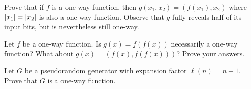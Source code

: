 \documentclass[12pt,letterpaper,boxed]{amspset}
\begin{document}
\begin{problem}[6.1]
Prove that if $f$ is a one-way function, then $g(x_1,x_2) = (f(x_1),x_2)$ where $\lvert x_1\rvert = \lvert x_2\rvert$ is also a one-way function. Observe that $g$ fully reveals half of its input bits, but is nevertheless still one-way.
\end{problem}

\begin{solution}


\vspace{5cm}
\end{solution}

\begin{problem}[6.2]
Let $f$ be a one-way function. Is $g(x) = f(f(x))$ necessarily a one-way function? What about $g(x) = (f(x),f(f(x)))$? Prove your answers.
\end{problem}

\begin{solution}
\vspace{5cm}
\end{solution}
\begin{problem}[6.3]
Let $G$ be a pseudorandom generator with expansion factor $\ell(n)=n+1$. Prove that $G$ is a one-way function.
\end{problem}

\begin{solution}
\vspace{5cm}
\end{solution}
\end{document}
